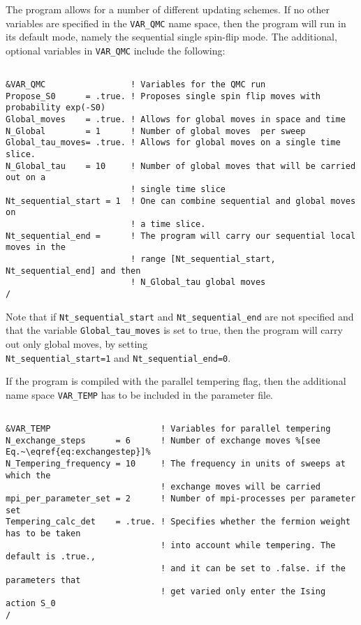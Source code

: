 The program allows for a number of different  updating schemes.  If no other variables are specified in the \texttt{VAR\_QMC} name space, then the program will run in its default mode, namely the sequential single spin-flip mode.   The additional, optional variables in   \texttt{VAR\_QMC}   include the following: 
\begin{lstlisting}[style=fortran]

&VAR_QMC                 ! Variables for the QMC run 
Propose_S0      = .true. ! Proposes single spin flip moves with probability exp(-S0) 
Global_moves    = .true. ! Allows for global moves in space and time 
N_Global        = 1      ! Number of global moves  per sweep 
Global_tau_moves= .true. ! Allows for global moves on a single time slice.  
N_Global_tau    = 10     ! Number of global moves that will be carried out on a 
                         ! single time slice
Nt_sequential_start = 1  ! One can combine sequential and global moves on 
                         ! a time slice.  
Nt_sequential_end =      ! The program will carry our sequential local moves in the
                         ! range [Nt_sequential_start, Nt_sequential_end] and then
                         ! N_Global_tau global moves
/   
\end{lstlisting}
Note that if \texttt{Nt\_sequential\_start}  and \texttt{Nt\_sequential\_end}  are not specified and that the variable \texttt{Global\_tau\_moves}  is set to true, then  the program will  carry out only global moves, by setting  \\  \texttt{Nt\_sequential\_start=1}  and \texttt{Nt\_sequential\_end=0}. 

If the program is compiled with the parallel tempering flag, then the additional name space \texttt{VAR\_TEMP} has to be included in the parameter file.
\begin{lstlisting}[style=fortran,escapechar=\%]

&VAR_TEMP                      ! Variables for parallel tempering
N_exchange_steps      = 6      ! Number of exchange moves %[see Eq.~\eqref{eq:exchangestep}]%
N_Tempering_frequency = 10     ! The frequency in units of sweeps at which the
                               ! exchange moves will be carried 
mpi_per_parameter_set = 2      ! Number of mpi-processes per parameter set
Tempering_calc_det    = .true. ! Specifies whether the fermion weight has to be taken
                               ! into account while tempering. The default is .true.,
                               ! and it can be set to .false. if the parameters that
                               ! get varied only enter the Ising action S_0
/
\end{lstlisting}

